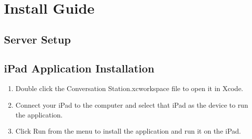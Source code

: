 \chapter{Install Guide}

\section{Server Setup}

\section{iPad Application Installation}

\begin{enumerate}
\item Double click the Conversation Station.xcworkspace file to open it in Xcode.
\item Connect your iPad to the computer and select that iPad as the device to run the application.
\item Click Run from the menu to install the application and run it on the iPad.
\end{enumerate}